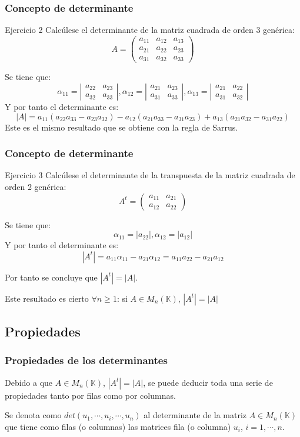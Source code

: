 \documentclass[aspectratio=169]{beamer}
\begin{document}
         \begin{frame}
  \frametitle{Concepto de determinante}
   \begin{block}{Ejercicio 2}
Calc\'ulese el determinante de la matriz cuadrada de orden 3 gen\'erica:
\[A=  \left(\begin{array}{ccc}a_{11}&a_{12}&a_{13} \\a_{21}&a_{22}&a_{23} \\a_{31}&a_{32}&a_{33} \end{array}\right) \]
\end{block}
Se tiene que:
\[\alpha_{11} = \left|\begin{array}{cc}a_{22} & a_{23}\\a_{32} & a_{33} \end{array}\right|, 
\alpha_{12} = \left|\begin{array}{cc}a_{21} & a_{23}\\a_{31} & a_{33} \end{array}\right|,
\alpha_{13} = \left|\begin{array}{cc}a_{21} & a_{22}\\a_{31} & a_{32} \end{array}\right|\]
Y por tanto el determinante es:
\[|A| = a_{11}(a_{22}a_{33}-a_{23}a_{32})-a_{12}(a_{21}a_{33}-a_{31}a_{23})+a_{13}(a_{21}a_{32}-a_{31}a_{22})\]
Este es el mismo resultado que se obtiene con la regla de Sarrus.
  \end{frame} 
  
           \begin{frame}
  \frametitle{Concepto de determinante}
   \begin{block}{Ejercicio 3}
Calc\'ulese el determinante de la transpuesta de la matriz cuadrada de orden 2 gen\'erica:
\[A^t=  \left(\begin{array}{cc}a_{11}&a_{21} \\a_{12}&a_{22} \end{array}\right) \]
\end{block}
Se tiene que:
\[\alpha_{11} =|a_{22}|, \alpha_{12} =|a_{12}|\]
Y por tanto el determinante es:
\[|A^t| = a_{11}\alpha_{11}-a_{21}\alpha_{12} = a_{11}a_{22}-a_{21}a_{12}\]

Por tanto se concluye que $|A^t| = |A|$.

Este resultado es cierto $\forall n\geq 1$: si $A\in M_n(\mathbb{K})$, $|A^t| = |A|$
  \end{frame} 
  
    \subsection{Propiedades}
           \begin{frame}
  \frametitle{Propiedades de los determinantes}
 Debido a que $A\in M_n(\mathbb{K})$, $|A^t| = |A|$, se puede deducir toda una serie de propiedades tanto por filas como por columnas.
 
 Se denota como $det(u_1,\cdots, u_i,\cdots, u_n)$ al determinante de la matriz $A\in M_n(\mathbb{K})$ que tiene como filas (o columnas) las matrices fila (o columna) $u_i$, $i=1,\cdots, n$.

    \end{frame} 
  
\end{document}
